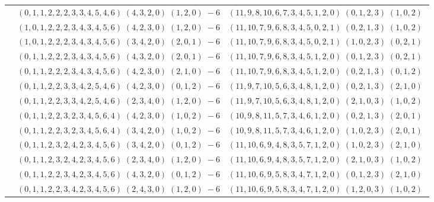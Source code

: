 \documentclass[11pt]{article}
\begin{document}
\begin{longtable}[l]{|c|c|c|}
 \cline{2-3} 
 & $(0 ,1 ,1 ,2 ,2 ,2 ,3 ,3 ,4 ,5 ,4 ,6) \;(4 ,3 ,2 ,0) \;(1 ,2 ,0) \;-6$ & $(11 ,9 ,8 ,10 ,6 ,7 ,3 ,4 ,5 ,1 ,2 ,0) \;(0 ,1 ,2 ,3) \;(1 ,0 ,2) \;$\\ 
 \cline{2-3} 
 & $(1 ,0 ,1 ,2 ,2 ,2 ,3 ,4 ,3 ,4 ,5 ,6) \;(4 ,2 ,3 ,0) \;(1 ,2 ,0) \;-6$ & $(11 ,10 ,7 ,9 ,6 ,8 ,3 ,4 ,5 ,0 ,2 ,1) \;(0 ,2 ,1 ,3) \;(1 ,0 ,2) \;$\\ 
 \cline{2-3} 
 & $(1 ,0 ,1 ,2 ,2 ,2 ,3 ,4 ,3 ,4 ,5 ,6) \;(3 ,4 ,2 ,0) \;(2 ,0 ,1) \;-6$ & $(11 ,10 ,7 ,9 ,6 ,8 ,3 ,4 ,5 ,0 ,2 ,1) \;(1 ,0 ,2 ,3) \;(0 ,2 ,1) \;$\\ 
 \cline{2-3} 
 & $(0 ,1 ,1 ,2 ,2 ,2 ,3 ,4 ,3 ,4 ,5 ,6) \;(4 ,3 ,2 ,0) \;(2 ,0 ,1) \;-6$ & $(11 ,10 ,7 ,9 ,6 ,8 ,3 ,4 ,5 ,1 ,2 ,0) \;(0 ,1 ,2 ,3) \;(0 ,2 ,1) \;$\\ 
 \cline{2-3} 
 & $(0 ,1 ,1 ,2 ,2 ,2 ,3 ,4 ,3 ,4 ,5 ,6) \;(4 ,2 ,3 ,0) \;(2 ,1 ,0) \;-6$ & $(11 ,10 ,7 ,9 ,6 ,8 ,3 ,4 ,5 ,1 ,2 ,0) \;(0 ,2 ,1 ,3) \;(0 ,1 ,2) \;$\\ 
 \cline{2-3} 
 & $(0 ,1 ,1 ,2 ,2 ,3 ,3 ,4 ,2 ,5 ,4 ,6) \;(4 ,2 ,3 ,0) \;(0 ,1 ,2) \;-6$ & $(11 ,9 ,7 ,10 ,5 ,6 ,3 ,4 ,8 ,1 ,2 ,0) \;(0 ,2 ,1 ,3) \;(2 ,1 ,0) \;$\\ 
 \cline{2-3} 
 & $(0 ,1 ,1 ,2 ,2 ,3 ,3 ,4 ,2 ,5 ,4 ,6) \;(2 ,3 ,4 ,0) \;(1 ,2 ,0) \;-6$ & $(11 ,9 ,7 ,10 ,5 ,6 ,3 ,4 ,8 ,1 ,2 ,0) \;(2 ,1 ,0 ,3) \;(1 ,0 ,2) \;$\\ 
 \cline{2-3} 
 & $(0 ,1 ,1 ,2 ,2 ,3 ,2 ,3 ,4 ,5 ,6 ,4) \;(4 ,2 ,3 ,0) \;(1 ,0 ,2) \;-6$ & $(10 ,9 ,8 ,11 ,5 ,7 ,3 ,4 ,6 ,1 ,2 ,0) \;(0 ,2 ,1 ,3) \;(2 ,0 ,1) \;$\\ 
 \cline{2-3} 
 & $(0 ,1 ,1 ,2 ,2 ,3 ,2 ,3 ,4 ,5 ,6 ,4) \;(3 ,4 ,2 ,0) \;(1 ,0 ,2) \;-6$ & $(10 ,9 ,8 ,11 ,5 ,7 ,3 ,4 ,6 ,1 ,2 ,0) \;(1 ,0 ,2 ,3) \;(2 ,0 ,1) \;$\\ 
 \cline{2-3} 
 & $(0 ,1 ,1 ,2 ,3 ,2 ,4 ,2 ,3 ,4 ,5 ,6) \;(3 ,4 ,2 ,0) \;(0 ,1 ,2) \;-6$ & $(11 ,10 ,6 ,9 ,4 ,8 ,3 ,5 ,7 ,1 ,2 ,0) \;(1 ,0 ,2 ,3) \;(2 ,1 ,0) \;$\\ 
 \cline{2-3} 
 & $(0 ,1 ,1 ,2 ,3 ,2 ,4 ,2 ,3 ,4 ,5 ,6) \;(2 ,3 ,4 ,0) \;(1 ,2 ,0) \;-6$ & $(11 ,10 ,6 ,9 ,4 ,8 ,3 ,5 ,7 ,1 ,2 ,0) \;(2 ,1 ,0 ,3) \;(1 ,0 ,2) \;$\\ 
 \cline{2-3} 
 & $(0 ,1 ,1 ,2 ,2 ,3 ,4 ,2 ,3 ,4 ,5 ,6) \;(4 ,3 ,2 ,0) \;(0 ,1 ,2) \;-6$ & $(11 ,10 ,6 ,9 ,5 ,8 ,3 ,4 ,7 ,1 ,2 ,0) \;(0 ,1 ,2 ,3) \;(2 ,1 ,0) \;$\\ 
 \cline{2-3} 
 & $(0 ,1 ,1 ,2 ,2 ,3 ,4 ,2 ,3 ,4 ,5 ,6) \;(2 ,4 ,3 ,0) \;(1 ,2 ,0) \;-6$ & $(11 ,10 ,6 ,9 ,5 ,8 ,3 ,4 ,7 ,1 ,2 ,0) \;(1 ,2 ,0 ,3) \;(1 ,0 ,2) \;$\\ 

\end{longtable}
\end{document}
